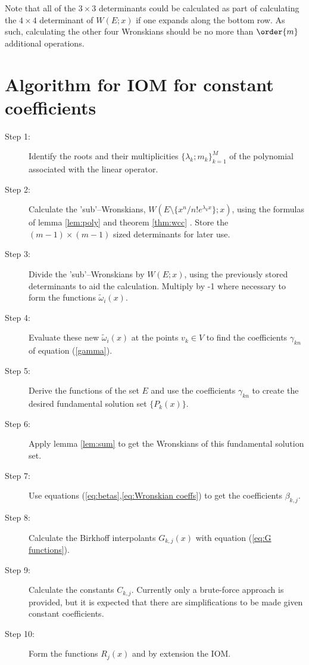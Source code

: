 \documentclass{book}
\begin{document}
Note that all of the $3 \times 3$ determinants could be calculated as part of calculating the $4 \times 4$ determinant of $W(E;x)$ if one expands along the bottom row.
As such, calculating the other four Wronskians should be no more than $\order{m}$ additional operations.

\section{Algorithm for IOM for constant coefficients}

\begin{description}
\item[Step 1:] Identify the roots and their multiplicities $\{ \lambda_k ; m_k \}_{k=1}^M$ of the polynomial associated with the linear operator.
\item[Step 2:] Calculate the 'sub'--Wronskians, $W(E \setminus \{x^n/n! e^{\lambda_k x} \} ; x)$, using the formulas of lemma \ref{lem:poly} and theorem \ref{thm:wcc} .
Store the $(m-1) \times (m-1)$ sized determinants for later use.
\item[Step 3:] Divide the 'sub'--Wronskians by $W(E;x)$, using the previously stored determinants to aid the calculation.
Multiply by -1 where necessary to form the functions $\tilde{\omega}_i(x)$.
\item[Step 4:] Evaluate these new $\tilde{\omega}_i(x)$ at the points $v_k \in V$ to find the coefficients $\gamma_{kn}$ of equation (\ref{gamma}).
\item[Step 5:] Derive the functions of the set $E$ and use the coefficients $\gamma_{kn}$ to create the desired fundamental solution set $\{ P_k(x) \}$.
\item[Step 6:] Apply lemma \ref{lem:sum} to get the Wronskians of this fundamental solution set.
\item[Step 7:] Use equations (\ref{eq:betas},\ref{eq:Wronskian coeffs}) to get the coefficients $\beta_{k,j}$.
\item[Step 8:] Calculate the Birkhoff interpolants $G_{k,j}(x)$ with equation (\ref{eq:G functions}).
\item[Step 9:] Calculate the constants $C_{k,j}$.
Currently only a brute-force approach is provided, but it is expected that there are simplifications to be made given constant coefficients.
\item[Step 10:] Form the functions $R_j(x)$ and by extension the IOM.
\end{description}



%
\end{document}

